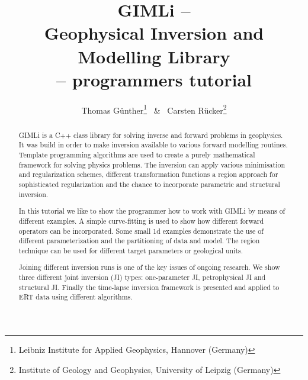 \documentclass[a4paper,DIV12]{scrartcl}
\author{
Thomas G{\"u}nther\thanks{Leibniz Institute for Applied Geophysics, Hannover (Germany)} 
\ \& \ 
Carsten R{\"u}cker\thanks{Institute of Geology and Geophysics, University of Leipzig (Germany)}
}
\title{GIMLi --\\ Geophysical Inversion and Modelling Library \\-- programmers tutorial}
\begin{document}
\maketitle
\begin{abstract}
GIMLi is a C++ class library for solving inverse and forward problems in geophysics.
It was build in order to make inversion available to various forward modelling routines.
Template programming algorithms are used to create a purely mathematical framework for solving physics problems.
The inversion can apply various minimisation and regularization schemes, different transformation functions a region approach for sophisticated regularization and the chance to incorporate parametric and structural inversion.

In this tutorial we like to show the programmer how to work with GIMLi by means of different examples.
A simple curve-fitting is used to show how different forward operators can be incorporated.
Some small 1d examples demonstrate the use of different parameterization and the partitioning of data and model.
The region technique can be used for different target parameters or geological units.

Joining different inversion runs is one of the key issues of ongoing research.
We show three different joint inversion (JI) types: one-parameter JI, petrophysical JI and structural JI.
Finally the time-lapse inversion framework is presented and applied to ERT data using different algorithms.
\end{abstract}

\clearpage
\tableofcontents











\end{document}
